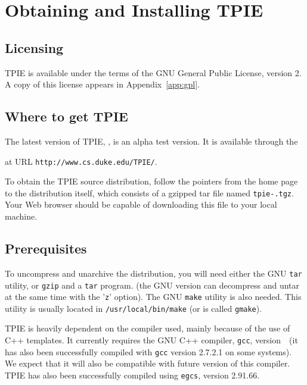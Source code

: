 \chapter{Obtaining and Installing TPIE}

\section{Licensing}

TPIE is available under the terms of the GNU General Public License,
 version 2.  A copy of this license appears in
Appendix~\ref{app:gpl}.

\section{Where to get TPIE}

The latest version of TPIE, \version, is an alpha test version.  It is
available through the %
\begin{latexonly}
at URL \verb|http://www.cs.duke.edu/TPIE/|.
\end{latexonly}
To obtain the TPIE source distribution, follow
the pointers from the home page to the distribution itself, which consists
of a gzipped tar file named {\tt tpie-\version.tgz}. Your Web browser
should be capable of downloading this file to your local machine.


\section{Prerequisites}
\label{sec:gnu-software}

To uncompress and unarchive the distribution, you will need either the GNU
\verb|tar| utility, or \verb|gzip| and a \verb|tar| program. (the GNU
version can decompress and untar at the same time with the '\verb|z|'
option). The GNU \verb|make| utility is also needed. This utility is
usually located in \verb|/usr/local/bin/make| (or is called
\verb|gmake|).

TPIE is heavily dependent on the compiler used, mainly because of the use
of C++ templates. It currently requires the GNU C++ compiler, \verb|gcc|,
version~\gxxversion~(it has also been successfully compiled with \verb|gcc|
version 2.7.2.1 on some systems). We expect that it will also be compatible
with future version of this compiler. TPIE has also been successfully
compiled using \verb|egcs|, version 2.91.66.

